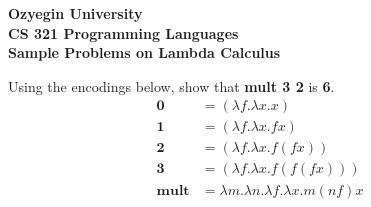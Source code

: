 \documentclass[addpoints]{exam}
\renewcommand{\L}[2]{\lambda #1.#2}
\begin{document}
\begin{center}
{\Large \textbf{
    Ozyegin University\\
    CS 321 Programming Languages\\
    Sample Problems on Lambda Calculus
}}
\end{center}

\begin{questions}
  \question
  Using the encodings below, show that \textbf{mult 3 2} is \textbf{6}.
  \begin{align*}
    \textbf{0} & = (\L{f}{\L{x}{x}})\\
    \textbf{1} & = (\L{f}{\L{x}{f x}})\\
    \textbf{2} & = (\L{f}{\L{x}{f (f x)}})\\
    \textbf{3} & = (\L{f}{\L{x}{f (f (f x))}})\\
    \textbf{mult} & = \L{m}{\L{n}{\L{f}{\L{x}{m (n f) x}}}}
  \end{align*}


\end{questions}
\end{document}
